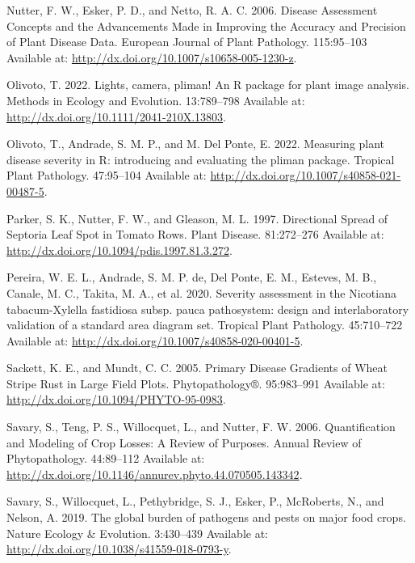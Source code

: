 \documentclass[
  letterpaper,
]{book}
\newlength{\cslhangindent}
\newlength{\cslentryspacingunit} %
\newenvironment{CSLReferences}[2] %
 {%
  \setlength{\parindent}{0pt}
  \ifodd #1
  \let\oldpar\par
  \def\par{\hangindent=\cslhangindent\oldpar}
  \fi
  \setlength{\parskip}{#2\cslentryspacingunit}
 }%
 {}
\begin{document}
\begin{CSLReferences}{0}{0}
\leavevmode{}%
Nutter, F. W., Esker, P. D., and Netto, R. A. C. 2006. Disease
Assessment Concepts and the Advancements Made in Improving the Accuracy
and Precision of Plant Disease Data. European Journal of Plant
Pathology. 115:95--103 Available at:
\url{http://dx.doi.org/10.1007/s10658-005-1230-z}.

\leavevmode{}%
Olivoto, T. 2022. Lights, camera, pliman! An R package for plant image
analysis. Methods in Ecology and Evolution. 13:789--798 Available at:
\url{http://dx.doi.org/10.1111/2041-210X.13803}.

\leavevmode{}%
Olivoto, T., Andrade, S. M. P., and M. Del Ponte, E. 2022. Measuring
plant disease severity in R: introducing and evaluating the pliman
package. Tropical Plant Pathology. 47:95--104 Available at:
\url{http://dx.doi.org/10.1007/s40858-021-00487-5}.

\leavevmode{}%
Parker, S. K., Nutter, F. W., and Gleason, M. L. 1997. Directional
Spread of Septoria Leaf Spot in Tomato Rows. Plant Disease. 81:272--276
Available at: \url{http://dx.doi.org/10.1094/pdis.1997.81.3.272}.

\leavevmode{}%
Pereira, W. E. L., Andrade, S. M. P. de, Del Ponte, E. M., Esteves, M.
B., Canale, M. C., Takita, M. A., et al. 2020. Severity assessment in
the Nicotiana tabacum-Xylella fastidiosa subsp. pauca pathosystem:
design and interlaboratory validation of a standard area diagram set.
Tropical Plant Pathology. 45:710--722 Available at:
\url{http://dx.doi.org/10.1007/s40858-020-00401-5}.

\leavevmode{}%
Sackett, K. E., and Mundt, C. C. 2005. Primary Disease Gradients of
Wheat Stripe Rust in Large Field Plots. Phytopathology®. 95:983--991
Available at: \url{http://dx.doi.org/10.1094/PHYTO-95-0983}.

\leavevmode{}%
Savary, S., Teng, P. S., Willocquet, L., and Nutter, F. W. 2006.
Quantification and Modeling of Crop Losses: A Review of Purposes. Annual
Review of Phytopathology. 44:89--112 Available at:
\url{http://dx.doi.org/10.1146/annurev.phyto.44.070505.143342}.

\leavevmode{}%
Savary, S., Willocquet, L., Pethybridge, S. J., Esker, P., McRoberts,
N., and Nelson, A. 2019. The global burden of pathogens and pests on
major food crops. Nature Ecology \& Evolution. 3:430--439 Available at:
\url{http://dx.doi.org/10.1038/s41559-018-0793-y}.


\end{CSLReferences}
\end{document}
